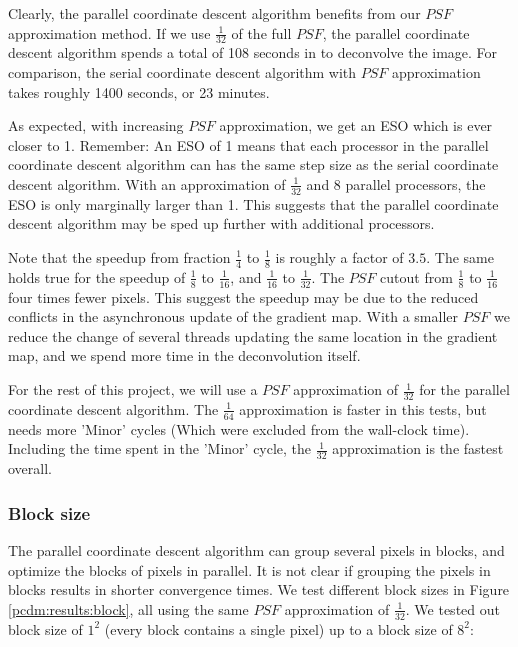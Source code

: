 Clearly, the parallel coordinate descent algorithm benefits from our $PSF$ approximation method. If we use $\frac{1}{32}$ of the full $PSF$, the parallel coordinate descent algorithm spends a total of 108 seconds in to deconvolve the image. For comparison, the serial coordinate descent algorithm with $PSF$ approximation takes roughly 1400 seconds, or 23 minutes.

As expected, with increasing $PSF$ approximation, we get an ESO which is ever closer to 1. Remember: An ESO of 1 means that each processor in the parallel coordinate descent algorithm can has the same step size as the serial coordinate descent algorithm. With an approximation of $\frac{1}{32}$ and 8 parallel processors, the ESO is only marginally larger than 1. This suggests that the parallel coordinate descent algorithm may be sped up further with additional processors.

Note that the speedup from fraction $\frac{1}{4}$ to $\frac{1}{8}$ is roughly a factor of $3.5$. The same holds true for the speedup of $\frac{1}{8}$ to $\frac{1}{16}$, and $\frac{1}{16}$ to $\frac{1}{32}$. The $PSF$ cutout from  $\frac{1}{8}$ to  $\frac{1}{16}$ four times fewer pixels. This suggest the speedup may be due to the reduced conflicts in the asynchronous update of the gradient map. With a smaller $PSF$ we reduce the change of several threads updating the same location in the gradient map, and we spend more time in the deconvolution itself.

For the rest of this project, we will use a $PSF$ approximation of $\frac{1}{32}$ for the parallel coordinate descent algorithm. The $\frac{1}{64}$ approximation is faster in this tests, but needs more 'Minor' cycles (Which were excluded from the wall-clock time). Including the time spent in the 'Minor' cycle, the $\frac{1}{32}$ approximation is the fastest overall.


\subsubsection{Block size}
The parallel coordinate descent algorithm can group several pixels in blocks, and optimize the blocks of pixels in parallel. It is not clear if grouping the pixels in blocks results in shorter convergence times. We test different block sizes in Figure \ref{pcdm:results:block}, all using the same $PSF$ approximation of $\frac{1}{32}$. We tested out block size of $1^2$ (every block contains a single pixel) up to a block size of $8^2$:

